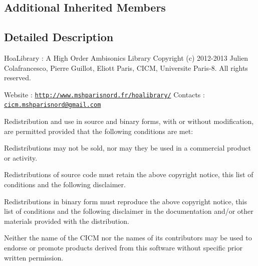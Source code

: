 \subsection*{Additional Inherited Members}


\subsection{Detailed Description}
Hoa\-Library \-: A High Order Ambisonics Library Copyright (c) 2012-\/2013 Julien Colafrancesco, Pierre Guillot, Eliott Paris, C\-I\-C\-M, Universite Paris-\/8. All rights reserved.

Website \-: \href{http://www.mshparisnord.fr/hoalibrary/}{\tt http\-://www.\-mshparisnord.\-fr/hoalibrary/} Contacts \-: \href{mailto:cicm.mshparisnord@gmail.com}{\tt cicm.\-mshparisnord@gmail.\-com}

Redistribution and use in source and binary forms, with or without modification, are permitted provided that the following conditions are met\-:


\begin{DoxyItemize}
\item Redistributions may not be sold, nor may they be used in a commercial product or activity.
\item Redistributions of source code must retain the above copyright notice, this list of conditions and the following disclaimer.
\item Redistributions in binary form must reproduce the above copyright notice, this list of conditions and the following disclaimer in the documentation and/or other materials provided with the distribution.
\item Neither the name of the C\-I\-C\-M nor the names of its contributors may be used to endorse or promote products derived from this software without specific prior written permission.
\end{DoxyItemize}

